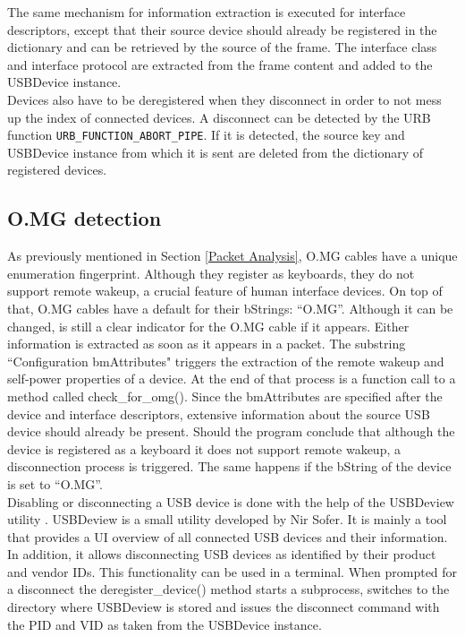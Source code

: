 The same mechanism for information extraction is executed for interface descriptors, except that their source device should already be registered in the dictionary and can be retrieved by the source of the frame. The interface class and interface protocol are extracted from the frame content and added to the USBDevice instance.\\
Devices also have to be deregistered when they disconnect in order to not mess up the index of connected devices. A disconnect can be detected by the URB function \verb|URB_FUNCTION_ABORT_PIPE|. If it is detected, the source key and USBDevice instance from which it is sent are deleted from the dictionary of registered devices.


\subsection{O.MG detection}

As previously mentioned in Section \ref{Packet Analysis}, O.MG cables have a unique enumeration fingerprint. Although they register as keyboards, they do not support remote wakeup, a crucial feature of human interface devices. On top of that, O.MG cables have a default for their bStrings: ``O.MG''. Although it can be changed, is still a clear indicator for the O.MG cable if it appears. Either information is extracted as soon as it appears in a packet. The substring ``Configuration bmAttributes" triggers the extraction of the remote wakeup and self-power properties of a device. At the end of that process is a function call to a method called check\_for\_omg(). Since the bmAttributes are specified after the device and interface descriptors, extensive information about the source USB device should already be present. Should the program conclude that although the device is registered as a keyboard it does not support remote wakeup, a disconnection process is triggered. The same happens if the bString of the device is set to ``O.MG''. \\
Disabling or disconnecting a USB device is done with the help of the USBDeview utility \cite{ViewAnyInstalled}. USBDeview is a small utility developed by Nir Sofer. It is mainly a tool that provides a UI overview of all connected USB devices and their information. In addition, it allows disconnecting USB devices as identified by their product and vendor IDs. This functionality can be used in a terminal. When prompted for a disconnect the deregister\_device() method starts a subprocess, switches to the directory where USBDeview is stored and issues the disconnect command with the PID and VID as taken from the USBDevice instance.

